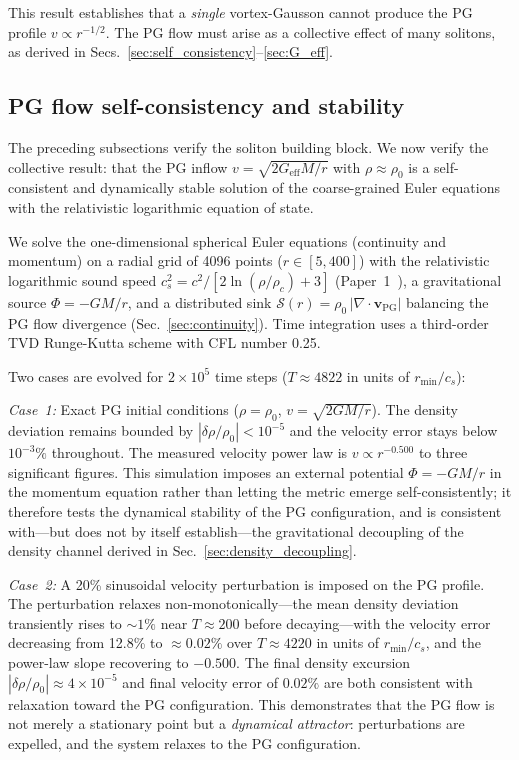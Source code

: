 \documentclass[12pt, a4paper]{article}
\newcommand{\Geff}{G_{\mathrm{eff}}}
\begin{document}
This result establishes that a \emph{single} vortex-Gausson cannot produce the PG profile $v \propto r^{-1/2}$. The PG flow must arise as a collective effect of many solitons, as derived in Secs.~\ref{sec:self_consistency}--\ref{sec:G_eff}.

\subsection{PG flow self-consistency and stability}

The preceding subsections verify the soliton building block. We now verify the collective result: that the PG inflow $v = \sqrt{2\Geff M/r}$ with $\rho \approx \rho_0$ is a self-consistent and dynamically stable solution of the coarse-grained Euler equations with the relativistic logarithmic equation of state.

We solve the one-dimensional spherical Euler equations (continuity and momentum) on a radial grid of 4096 points ($r \in [5, 400]$) with the relativistic logarithmic sound speed $c_s^2 = c^2/[2\ln(\rho/\rho_c) + 3]$ (Paper~1~\cite{kulangiev_2026}), a gravitational source $\Phi = -GM/r$, and a distributed sink $\mathcal{S}(r) = \rho_0\,|\nabla\cdot\mathbf{v}_{\mathrm{PG}}|$ balancing the PG flow divergence (Sec.~\ref{sec:continuity}). Time integration uses a third-order TVD Runge-Kutta scheme with CFL number 0.25.

Two cases are evolved for $2 \times 10^5$ time steps ($T \approx 4822$ in units of $r_{\mathrm{min}}/c_s$):

\emph{Case~1:} Exact PG initial conditions ($\rho = \rho_0$, $v = \sqrt{2GM/r}$). The density deviation remains bounded by $|\delta\rho/\rho_0| < 10^{-5}$ and the velocity error stays below $10^{-3}\%$ throughout. The measured velocity power law is $v \propto r^{-0.500}$ to three significant figures. This simulation imposes an external potential $\Phi = -GM/r$ in the momentum equation rather than letting the metric emerge self-consistently; it therefore tests the dynamical stability of the PG configuration, and is consistent with---but does not by itself establish---the gravitational decoupling of the density channel derived in Sec.~\ref{sec:density_decoupling}.

\emph{Case~2:} A 20\% sinusoidal velocity perturbation is imposed on the PG profile. The perturbation relaxes non-monotonically---the mean density deviation transiently rises to $\sim 1\%$ near $T \approx 200$ before decaying---with the velocity error decreasing from 12.8\% to $\approx 0.02\%$ over $T \approx 4220$ in units of $r_{\mathrm{min}}/c_s$, and the power-law slope recovering to $-0.500$. The final density excursion $|\delta\rho/\rho_0| \approx 4 \times 10^{-5}$ and final velocity error of $0.02\%$ are both consistent with relaxation toward the PG configuration. This demonstrates that the PG flow is not merely a stationary point but a \emph{dynamical attractor}: perturbations are expelled, and the system relaxes to the PG configuration. 
\end{document}
